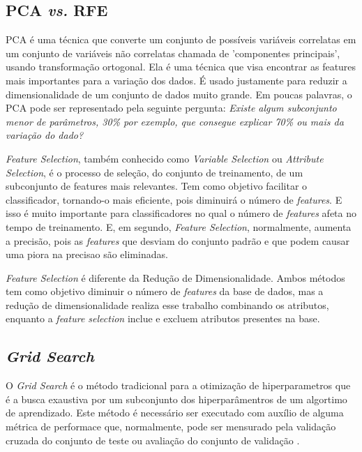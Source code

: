 \subsection{PCA \textit{vs.} RFE}
PCA é uma técnica que converte um conjunto de possíveis variáveis correlatas em um conjunto de variáveis não correlatas chamada de 'componentes principais', usando transformação ortogonal. Ela é uma técnica que visa encontrar as features mais importantes para a variação dos dados. É usado justamente para reduzir a dimensionalidade de um conjunto de dados muito grande. Em poucas palavras, o PCA pode ser representado pela seguinte pergunta: \textit{Existe algum subconjunto menor de parâmetros, 30\% por exemplo, que consegue explicar 70\% ou mais da variação do dado?}

\textit{Feature Selection}, também conhecido como \textit{Variable Selection} ou \textit{Attribute Selection}, é o processo de seleção, do conjunto de treinamento, de um subconjunto de features mais relevantes. Tem como objetivo facilitar o classificador, tornando-o mais eficiente, pois diminuirá o número de \textit{features}. E isso é muito importante para classificadores no qual o número de \textit{features} afeta no tempo de treinamento. E, em segundo, \textit{Feature Selection}, normalmente, aumenta a precisão, pois as \textit{features} que desviam do conjunto padrão e que podem causar uma piora na precisao são eliminadas.

\textit{Feature Selection} é diferente da Redução de Dimensionalidade. Ambos métodos tem como objetivo diminuir o número de \textit{features} da base de dados, mas a redução de dimensionalidade realiza esse trabalho combinando os atributos, enquanto a \textit{feature selection} inclue e excluem atributos presentes na base.

\subsection{\textit{Grid Search}}
O \textit{Grid Search} é o método tradicional para a otimização de hiperparametros que é a busca exaustiva por um subconjunto dos hiperparâmentros de um algortimo de aprendizado. Este método é necessário ser executado com auxílio de alguma métrica de performace que, normalmente, pode ser mensurado pela validação cruzada do conjunto de teste ou avaliação do conjunto de validação \cite{Hsu10}.